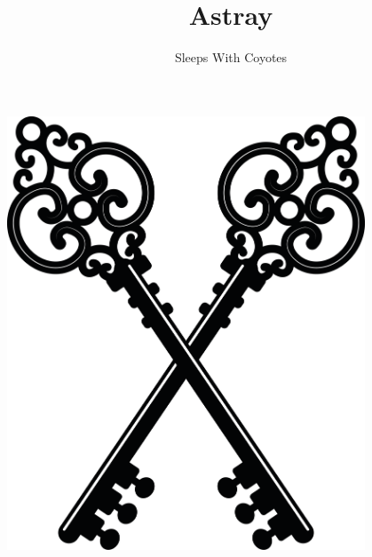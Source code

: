 \documentclass[a5paper,12pt,twoside,onecolumn,openright,showtrim,draft]{memoir}
\title{Astray}
\author{Sleeps With Coyotes}
\date{}
\begin{document}
\frontmatter
\cleartorecto
\thispagestyle{empty}
\begin{center}
\begin{vplace}
\Large{\thetitle}
\end{vplace}
\end{center}
\clearpage

\thispagestyle{empty}
\begin{center}
\begin{vplace}
\includegraphics[draft=false,width=0.8\textwidth]{contents/images/HTCHeritageLibraryKeeperofKeys02Element4}
\end{vplace}
\end{center}

\cleartorecto

\maketitle
\thispagestyle{empty}
\end{document}
